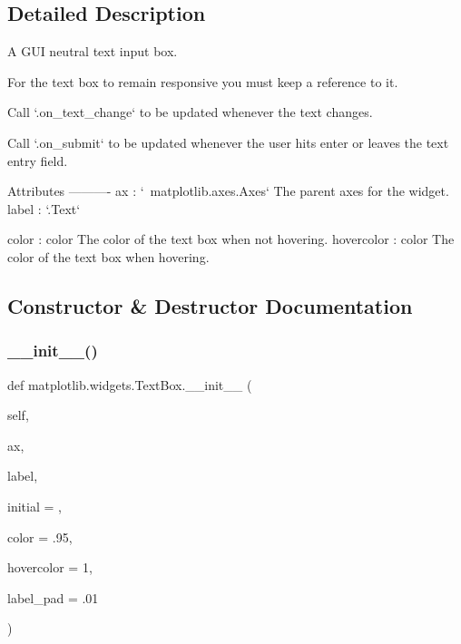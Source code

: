 \subsection{Detailed Description}
\begin{DoxyVerb}A GUI neutral text input box.

For the text box to remain responsive you must keep a reference to it.

Call `.on_text_change` to be updated whenever the text changes.

Call `.on_submit` to be updated whenever the user hits enter or
leaves the text entry field.

Attributes
----------
ax : `~matplotlib.axes.Axes`
    The parent axes for the widget.
label : `.Text`

color : color
    The color of the text box when not hovering.
hovercolor : color
    The color of the text box when hovering.
\end{DoxyVerb}
 

\subsection{Constructor \& Destructor Documentation}
\mbox{\label{classmatplotlib_1_1widgets_1_1TextBox_afc3ee9630ca2be79b517ba96f5ded944}} 
\subsubsection{\texorpdfstring{\+\_\+\+\_\+init\+\_\+\+\_\+()}{\_\_init\_\_()}}
{\footnotesize\ttfamily def matplotlib.\+widgets.\+Text\+Box.\+\_\+\+\_\+init\+\_\+\+\_\+ (\begin{DoxyParamCaption}\item[{}]{self,  }\item[{}]{ax,  }\item[{}]{label,  }\item[{}]{initial = {\ttfamily \textquotesingle{}\textquotesingle{}},  }\item[{}]{color = {\ttfamily \textquotesingle{}.95\textquotesingle{}},  }\item[{}]{hovercolor = {\ttfamily \textquotesingle{}1\textquotesingle{}},  }\item[{}]{label\+\_\+pad = {\ttfamily .01} }\end{DoxyParamCaption})}

